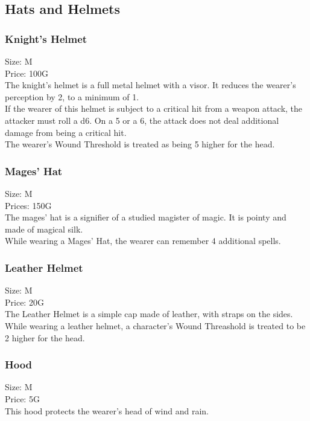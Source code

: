 \subsection{Hats and Helmets}

\subsubsection{Knight's Helmet}
Size: M\\
Price: 100G\\
The knight's helmet is a full metal helmet with a visor. It reduces the wearer's perception by 2, to a minimum of 1.\\
If the wearer of this helmet is subject to a critical hit from a weapon attack, the attacker must roll a d6. On a 5 or a 6, the attack does not deal additional damage from being a critical hit.\\
The wearer's Wound Threshold is treated as being 5 higher for the head.\\

\subsubsection{Mages' Hat}
Size: M\\
Prices: 150G\\
The mages' hat is a signifier of a studied magister of magic. It is pointy and made of magical silk.\\
While wearing a Mages' Hat, the wearer can remember 4 additional spells.\\

\subsubsection{Leather Helmet}
Size: M\\
Price: 20G\\
The Leather Helmet is a simple cap made of leather, with straps on the sides.\\
While wearing a leather helmet, a character's Wound Threashold is treated to be 2 higher for the head.\\

\subsubsection{Hood}
Size: M\\
Price: 5G\\
This hood protects the wearer's head of wind and rain.\\

